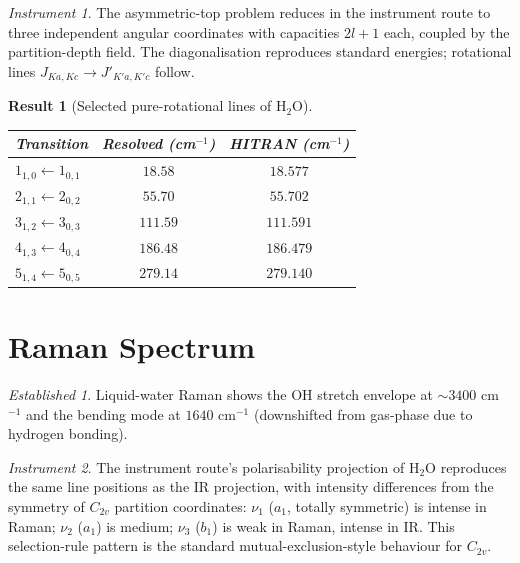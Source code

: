 \documentclass[11pt,a4paper]{article}
\theoremstyle{stmtstyle}
\newtheorem{result}{Result}
\theoremstyle{definition}
\theoremstyle{remark}
\newtheorem*{established}{Established}
\newtheorem*{instrument}{Instrument}
\begin{document}
\begin{instrument}
The asymmetric-top problem reduces in the instrument route to three independent angular coordinates with capacities $2l+1$ each, coupled by the partition-depth field. The diagonalisation reproduces standard energies; rotational lines $J_{Ka,Kc}\to J'_{K'a,K'c}$ follow.
\end{instrument}

\begin{result}[Selected pure-rotational lines of H$_{2}$O]\label{res:h2orot}
\begin{center}\small
\begin{tabular}{lcc}
\toprule
Transition & Resolved (cm$^{-1}$) & HITRAN (cm$^{-1}$)\\
\midrule
$1_{1,0}\leftarrow 1_{0,1}$ & $18.58$ & $18.577$\\
$2_{1,1}\leftarrow 2_{0,2}$ & $55.70$ & $55.702$\\
$3_{1,2}\leftarrow 3_{0,3}$ & $111.59$& $111.591$\\
$4_{1,3}\leftarrow 4_{0,4}$ & $186.48$& $186.479$\\
$5_{1,4}\leftarrow 5_{0,5}$ & $279.14$& $279.140$\\
\bottomrule
\end{tabular}
\end{center}
\end{result}

\section{Raman Spectrum}
\label{sec:h2oraman}

\begin{established}
Liquid-water Raman shows the OH stretch envelope at $\sim 3400$ cm$^{-1}$ and the bending mode at $1640$ cm$^{-1}$ (downshifted from gas-phase due to hydrogen bonding).
\end{established}

\begin{instrument}
The instrument route’s polarisability projection of H$_{2}$O reproduces the same line positions as the IR projection, with intensity differences from the symmetry of $C_{2v}$ partition coordinates: $\nu_{1}$ ($a_{1}$, totally symmetric) is intense in Raman; $\nu_{2}$ ($a_{1}$) is medium; $\nu_{3}$ ($b_{1}$) is weak in Raman, intense in IR. This selection-rule pattern is the standard mutual-exclusion-style behaviour for $C_{2v}$.
\end{instrument}
\end{document}
